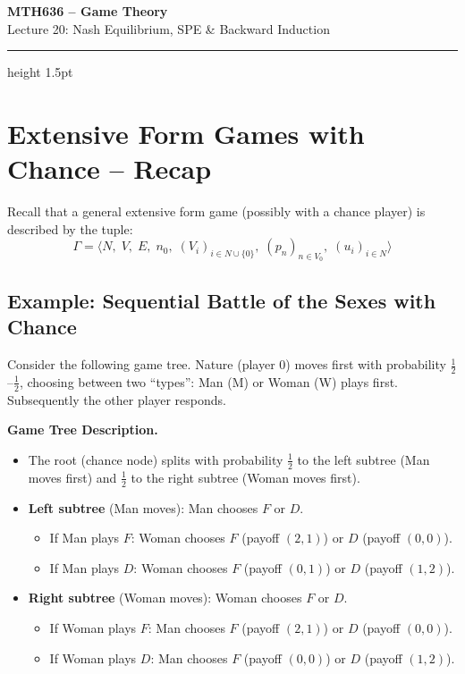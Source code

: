 \documentclass[12pt, a4paper]{article}
\begin{document}
\begin{center}
  {\LARGE\bfseries\sffamily\color{defblue} MTH636 -- Game Theory}\\[6pt]
  {\Large\sffamily Lecture 20: Nash Equilibrium, SPE \& Backward Induction}\\[4pt]
\end{center}
\vspace{0.5cm}
\hrule height 1.5pt
\vspace{0.3cm}

\section{Extensive Form Games with Chance -- Recap}

Recall that a general extensive form game (possibly with a chance player) is described by the tuple:
\[
  \Gamma = \langle N,\; V,\; E,\; n_0,\; (V_i)_{i \in N \cup \{0\}},\; (p_n)_{n \in V_0},\; (u_i)_{i \in N} \rangle
\]

\subsection{Example: Sequential Battle of the Sexes with Chance}

Consider the following game tree. Nature (player $0$) moves first with probability $\tfrac{1}{2}$--$\tfrac{1}{2}$, choosing between two ``types'': Man (M) or Woman (W) plays first. Subsequently the other player responds.

\medskip
\noindent\textbf{Game Tree Description.}
\begin{itemize}
  \item The root (chance node) splits with probability $\tfrac{1}{2}$ to the left subtree (Man moves first) and $\tfrac{1}{2}$ to the right subtree (Woman moves first).
  \item \textbf{Left subtree} (Man moves): Man chooses $F$ or $D$.
    \begin{itemize}
      \item If Man plays $F$: Woman chooses $F$ (payoff $(2,1)$) or $D$ (payoff $(0,0)$).
      \item If Man plays $D$: Woman chooses $F$ (payoff $(0,1)$) or $D$ (payoff $(1,2)$).
    \end{itemize}
  \item \textbf{Right subtree} (Woman moves): Woman chooses $F$ or $D$.
    \begin{itemize}
      \item If Woman plays $F$: Man chooses $F$ (payoff $(2,1)$) or $D$ (payoff $(0,0)$).
      \item If Woman plays $D$: Man chooses $F$ (payoff $(0,0)$) or $D$ (payoff $(1,2)$).
    \end{itemize}
\end{itemize}
\end{document}
